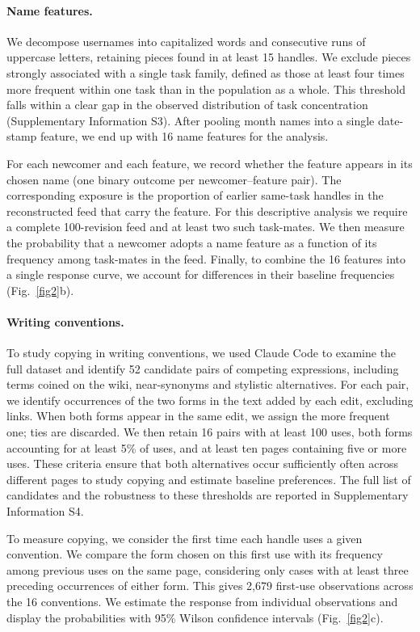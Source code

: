 \documentclass[11pt]{article}
\begin{document}
\paragraph{Name features.}
We decompose usernames into capitalized words and consecutive runs of uppercase letters, retaining pieces found in at least 15 handles. We exclude pieces strongly associated with a single task family, defined as those at least four times more frequent within one task than in the population as a whole. This threshold falls within a clear gap in the observed distribution of task concentration (Supplementary Information S3). After pooling month names into a single date-stamp feature, we end up with 16 name features for the analysis.

For each newcomer and each feature, we record whether the feature appears in its chosen name (one binary outcome per newcomer--feature pair). The corresponding exposure is the proportion of earlier same-task handles in the reconstructed feed that carry the feature. For this descriptive analysis we require a complete 100-revision feed and at least two such task-mates. We then measure the probability that a newcomer adopts a name feature as a function of its frequency among task-mates in the feed. Finally, to combine the 16 features into a single response curve, we account for differences in their baseline frequencies (Fig.~\ref{fig2}b).

\paragraph{Writing conventions.}
To study copying in writing conventions, we used Claude Code to examine the full dataset and identify 52 candidate pairs of competing expressions, including terms coined on the wiki, near-synonyms and stylistic alternatives. For each pair, we identify occurrences of the two forms in the text added by each edit, excluding links. When both forms appear in the same edit, we assign the more frequent one; ties are discarded. We then retain 16 pairs with at least 100 uses, both forms accounting for at least 5\% of uses, and at least ten pages containing five or more uses. These criteria ensure that both alternatives occur sufficiently often across different pages to study copying and estimate baseline preferences. The full list of candidates and the robustness to these thresholds are reported in Supplementary Information S4.

To measure copying, we consider the first time each handle uses a given convention. We compare the form chosen on this first use with its frequency among previous uses on the same page, considering only cases with at least three preceding occurrences of either form. This gives 2,679 first-use observations across the 16 conventions. We estimate the response from individual observations and display the probabilities with 95\% Wilson confidence intervals (Fig.~\ref{fig2}c).
\end{document}
